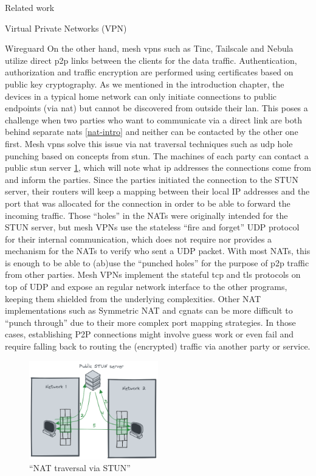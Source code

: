 \begin{frame}[fragile]{Related work}
\begin{block}{Virtual Private Networks (VPN)}
\begin{block}{Wireguard}
On the other hand, mesh \glspl{vpn} such as Tinc\autocite{tincDocs},
Tailscale\autocite{tailscaleDocs} and Nebula\autocite{nebulaDocs}
utilize direct \gls{p2p} links between the clients for the data traffic.
Authentication, authorization and traffic encryption are performed using
certificates based on public key cryptography. As we mentioned in the
introduction chapter, the devices in a typical home network can only
initiate connections to public endpoints (via \gls{nat}) but cannot be
discovered from outside their \gls{lan}. This poses a challenge when two
parties who want to communicate via a direct link are both behind
separate \glspl{nat} \ref{nat-intro} and neither can be contacted by the
other one first. Mesh \glspl{vpn} solve this issue via \gls{nat}
traversal techniques such as \gls{udp} hole punching based on concepts
from \gls{stun}. The machines of each party can contact a public
\gls{stun} server \ref{nat-traversal}, which will note what \gls{ip}
addresses the connections come from and inform the parties. Since the
parties initiated the connection to the STUN server, their routers will
keep a mapping between their local IP addresses and the port that was
allocated for the connection in order to be able to forward the incoming
traffic. Those ``holes'' in the NATs were originally intended for the
STUN server, but mesh VPNs use the stateless ``fire and forget'' UDP
protocol for their internal communication, which does not require nor
provides a mechanism for the NATs to verify who sent a UDP packet. With
most NATs, this is enough to be able to (ab)use the ``punched holes''
for the purpose of \gls{p2p} traffic from other parties. Mesh VPNs
implement the stateful \gls{tcp} and \gls{tls} protocols on top of UDP
and expose an regular network interface to the other programs, keeping
them shielded from the underlying complexities. Other NAT
implementations such as Symmetric NAT and \glspl{cgnat} can be more
difficult to ``punch through'' due to their more complex port mapping
strategies. In those cases, establishing P2P connections might involve
guess work or even fail and require falling back to routing the
(encrypted) traffic via another party or service.

\begin{figure}
\centering
\includegraphics[width=0.5\textwidth,height=0.25\textheight]{thesis/../figures/nat-traversal.png}
\caption{``NAT traversal via STUN''\label{nat-traversal}}
\end{figure}


\end{block}
\end{block}
\end{frame}
